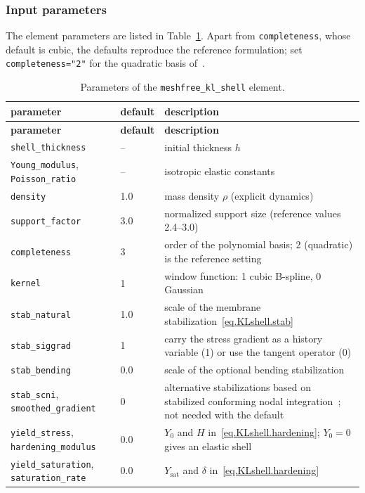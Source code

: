 \subsubsection{Input parameters}
The element parameters are listed in Table~\ref{tab.KLshell.params}. Apart from
\texttt{completeness}, whose default is cubic, the defaults reproduce the reference formulation;
set \texttt{completeness="2"} for the quadratic basis of~\cite{WangBazilevs2025}.
\begin{longtable}{|p{1.7in}|p{0.7in}|p{3.4in}|}
\caption{\label{tab.KLshell.params} Parameters of the \texttt{meshfree\_kl\_shell} element.}\\
\hline
\textbf{parameter} & \textbf{default} & \textbf{description}\\
\hline
\endfirsthead
\hline
\textbf{parameter} & \textbf{default} & \textbf{description}\\
\hline
\endhead
\texttt{shell\_thickness} & -- & initial thickness $h$\\ \hline
\texttt{Young\_modulus}, \texttt{Poisson\_ratio} & -- & isotropic elastic constants\\ \hline
\texttt{density} & 1.0 & mass density $\rho$ (explicit dynamics)\\ \hline
\texttt{support\_factor} & 3.0 & normalized support size (reference values 2.4--3.0)\\ \hline
\texttt{completeness} & 3 & order of the polynomial basis; 2 (quadratic) is the reference setting\\ \hline
\texttt{kernel} & 1 & window function: 1 cubic B-spline, 0 Gaussian\\ \hline
\texttt{stab\_natural} & 1.0 & scale of the membrane stabilization~\eqref{eq.KLshell.stab}\\ \hline
\texttt{stab\_siggrad} & 1 & carry the stress gradient as a history variable (1) or use the tangent operator (0)\\ \hline
\texttt{stab\_bending} & 0.0 & scale of the optional bending stabilization\\ \hline
\texttt{stab\_scni}, \texttt{smoothed\_gradient} & 0 & alternative stabilizations based on stabilized conforming nodal integration~\cite{Chen2001}; not needed with the default\\ \hline
\texttt{yield\_stress}, \texttt{hardening\_modulus} & 0.0 & $Y_{0}$ and $H$ in~\eqref{eq.KLshell.hardening}; $Y_{0}=0$ gives an elastic shell\\ \hline
\texttt{yield\_saturation}, \texttt{saturation\_rate} & 0.0 & $Y_{\textrm{sat}}$ and $\delta$ in~\eqref{eq.KLshell.hardening}\\ \hline

\end{longtable}
